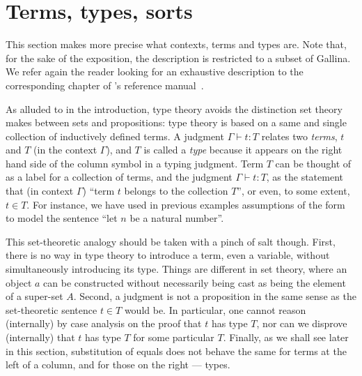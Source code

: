 



\section{Terms, types, sorts}\label{sec:terms}

This section makes more precise what contexts, terms and types
are. Note that,
for the sake of the exposition,
the description is restricted to a subset of Gallina.
We refer again the reader looking for
an exhaustive description to the corresponding chapter of \Coq{}'s
reference manual~\cite{Coq:manual}.

As alluded to in the introduction, type theory avoids the distinction
set theory makes between sets and propositions: type theory is based
on a same and single collection of inductively defined terms. A
judgment $\Gamma \vdash t : T$ relates two \emph{terms}, $t$ and $T$ (in the
context $\Gamma$), and $T$ is called a \emph{type} because it appears
on the right hand side of the column symbol in a typing judgment. Term $T$ can be
thought of as a label for a collection of terms, and the judgment
$\Gamma \vdash t : T$, as the statement that (in context $\Gamma$)
``term $t$ belongs to the collection $T$'', or even, to some extent,
$t\in T$. 
For instance, we have used in previous examples assumptions of the
form  to model the sentence ``let $n$ be a natural number''.

This set-theoretic analogy should be taken with a pinch of salt
though. First, there is no way in type theory to introduce a term, even
a variable, without simultaneously introducing its type. Things are
different in set theory, where an object $a$ can be constructed without
necessarily being cast as being the element of a super-set
$A$. Second, a judgment is not a proposition in the same sense as the
set-theoretic sentence $t \in T$ would be. In particular, one cannot
reason (internally) by case analysis on the proof that
$t$ has type $T$, nor can we disprove (internally) that $t$ has type $T$ for some particular
$T$. Finally, as we shall see later in this section, substitution of
equals does not behave the same for terms at the left of a column, and
for those on the right --- types.


